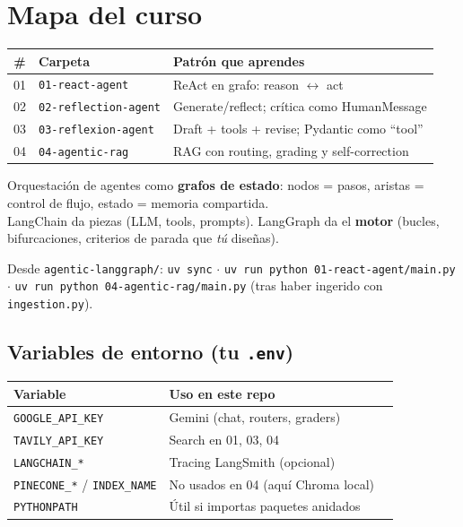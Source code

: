 \documentclass[11pt,a4paper]{article}
\begin{document}
\section{Mapa del curso}

\begin{center}
\begin{tabular}{@{}clp{9.0cm}@{}}
\toprule
\textbf{\#} & \textbf{Carpeta} & \textbf{Patrón que aprendes} \\
\midrule
01 & \texttt{01-react-agent} & ReAct en grafo: reason $\leftrightarrow$ act \\
02 & \texttt{02-reflection-agent} & Generate/reflect; crítica como HumanMessage \\
03 & \texttt{03-reflexion-agent} & Draft + tools + revise; Pydantic como ``tool'' \\
04 & \texttt{04-agentic-rag} & RAG con routing, grading y self-correction \\
\bottomrule
\end{tabular}
\end{center}

\begin{concept}[title=¿Qué es LangGraph?]
Orquestación de agentes como \textbf{grafos de estado}:
nodos = pasos, aristas = control de flujo, estado = memoria compartida.
\\[0.3em]
LangChain da piezas (LLM, tools, prompts). LangGraph da el \textbf{motor}
(bucles, bifurcaciones, criterios de parada que \emph{tú} diseñas).
\end{concept}

\begin{tip}[title=Cómo correr]
Desde \texttt{agentic-langgraph/}:
\texttt{uv sync} $\cdot$
\texttt{uv run python 01-react-agent/main.py} $\cdot$
\texttt{uv run python 04-agentic-rag/main.py}
(tras haber ingerido con \texttt{ingestion.py}).
\end{tip}

\subsection{Variables de entorno (tu \texttt{.env})}
\begin{center}
\begin{tabular}{@{}llp{6.5cm}@{}}
\toprule
\textbf{Variable} & \textbf{Uso en este repo} \\
\midrule
\texttt{GOOGLE\_API\_KEY} & Gemini (chat, routers, graders) \\
\texttt{TAVILY\_API\_KEY} & Search en 01, 03, 04 \\
\texttt{LANGCHAIN\_*} & Tracing LangSmith (opcional) \\
\texttt{PINECONE\_*} / \texttt{INDEX\_NAME} & No usados en 04 (aquí Chroma local) \\
\texttt{PYTHONPATH} & Útil si importas paquetes anidados \\
\bottomrule
\end{tabular}
\end{center}
\end{document}
